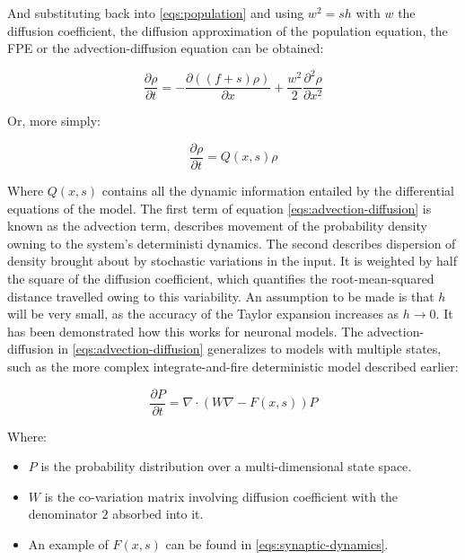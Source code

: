 		And substituting back into \ref{eqs:population} and using $w^2 = sh$ with $w$ the diffusion coefficient, the diffusion approximation of the population equation, the FPE or the advection-diffusion equation can be obtained:

		\begin{equation}
			\frac{\partial\rho}{\partial t} = -\frac{\partial((f+s)\rho)}{\partial x} +\frac{w^2}{2}\frac{\partial^2\rho}{\partial x^2}
			\label{eqs:advection-diffusion}
		\end{equation}

		Or, more simply:

		\begin{equation}
			\frac{\partial\rho}{\partial t} = Q(x, s)\rho
		\end{equation}

		Where $Q(x,s)$ contains all the dynamic information entailed by the differential equations of the model.
		The first term of equation \ref{eqs:advection-diffusion} is known as the advection term, describes movement of the probability density owning to the system's deterministi dynamics.
		The second describes dispersion of density brought about by stochastic variations in the input.
		It is weighted by half the square of the diffusion coefficient, which quantifies the root-mean-squared distance travelled owing to this variability.
		An assumption to be made is that $h$ will be very small, as the accuracy of the Taylor expansion increases as $h\rightarrow 0$.
		It has been demonstrated how this works for neuronal models.
		The advection-diffusion in \ref{eqs:advection-diffusion} generalizes to models with multiple states, such as the more complex integrate-and-fire deterministic model described earlier:

		\begin{equation}
			\frac{\partial P}{\partial t} = \nabla\cdot(W\nabla - F(x,s))P
		\end{equation}

		Where:

		\begin{itemize}
			\item $P$ is the probability distribution over a multi-dimensional state space.
			\item $W$ is the co-variation matrix involving diffusion coefficient with the denominator $2$ absorbed into it.
			\item An example of $F(x,s)$ can be found in \ref{eqs:synaptic-dynamics}.
		\end{itemize}

